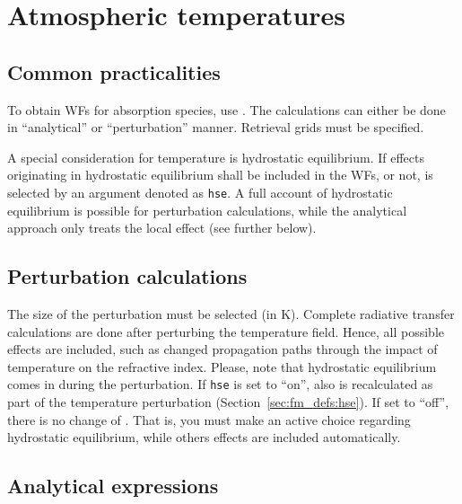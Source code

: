\section{Atmospheric temperatures}
\label{sec:wfuns:atmtemp}

\subsection{Common practicalities}
%
To obtain WFs for absorption species, use .
The calculations can either be done in ``analytical'' or ``perturbation''
manner. Retrieval grids must be specified.

A special consideration for temperature is hydrostatic equilibrium. If effects
originating in hydrostatic equilibrium shall be included in the WFs, or
not, is selected by an argument denoted as \verb|hse|. A full account of
hydrostatic equilibrium is possible for perturbation calculations, while the
analytical approach only treats the local effect (see further below).


\subsection{Perturbation calculations}
%
The size of the perturbation must be selected (in K).
Complete radiative transfer calculations are done after perturbing the
temperature field. Hence, all possible effects are included, such as changed
propagation paths through the impact of temperature on the refractive index.
Please, note that hydrostatic equilibrium comes in during the perturbation. If
\verb|hse| is set to ``on'', also  is recalculated as part
of the temperature perturbation (Section~\ref{sec:fm_defs:hse}). If set to
``off'', there is no change of . That is, you must make an
active choice regarding hydrostatic equilibrium, while others effects are
included automatically.


\subsection{Analytical expressions}
%
